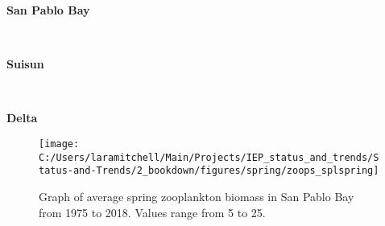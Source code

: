 \documentclass[
]{book}
\begin{document}
\begin{panel-grid}

\begin{columns-nocenter}

\begin{column800}

\textbf{San Pablo Bay}

\end{column800}

\begin{column40}

~

\end{column40}

\begin{column800}

\textbf{Suisun}

\end{column800}

\begin{column40}

~

\end{column40}

\begin{column800}

\textbf{Delta}

\end{column800}

\end{columns-nocenter}

\begin{columns-nocenter}

\begin{column800}

\begin{expand}

\begin{figure}
\texttt{[image: C:/Users/laramitchell/Main/Projects/IEP\_status\_and\_trends/Status-and-Trends/2\_bookdown/figures/spring/zoops\_splspring]} \caption{Graph of average spring zooplankton biomass in San Pablo Bay from 1975 to 2018. Values range from 5 to 25.}\label{fig:unnamed-chunk-27}
\end{figure}

\end{expand}

\end{column800}

\begin{column40}

~


\end{column40}
\end{columns-nocenter}
\end{panel-grid}
\end{document}
